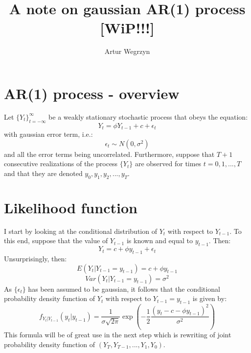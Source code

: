 \documentclass[12pt]{article}
\begin{document}
\title{A note on gaussian AR(1) process [WiP!!!]}
\author{Artur Wegrzyn}
\maketitle


\tableofcontents

\section{AR(1) process - overview}
Let $\{Y_t\}_{t=-\infty}^{\infty}$ be a weakly stationary stochastic process that obeys
the equation:
\begin{equation}
\label{ar1_def_eqtn}
Y_t = \phi Y_{t-1} + c + \epsilon_t
\end{equation}
with gaussian error term, i.e.:
\begin{equation}
\epsilon_t \sim N(0, \sigma^2)
\end{equation}
and all the error terms being uncorrelated. Furthermore, suppose that $T+1$ consecutive 
realizations of the process $\{Y_t\}$ are observed for times $t = 0, 1, ..., T$ and that
 they are denoted $y_0, y_1, y_2, ..., y_T$. \\
 

\section{Likelihood function}
I start by looking at the conditional distribution of $Y_t$ with respect to $Y_{t-1}$. 
To this end, suppose that the value of $Y_{t-1}$ is known and equal to $y_{t-1}$. Then:
\begin{equation*}
Y_t = c + \phi y_{t-1} + \epsilon_t
\end{equation*}
Unsurprisingly, then:
$$ E(Y_t | Y_{t-1} = y_{t-1}) = c + \phi y_{t-1} $$
$$Var(Y_t | Y_{t-1} = y_{t-1}) = \sigma^2 $$
As $\{\epsilon_t\}$ has been assumed to be gaussian, it follows that the conditional 
probability density function of $Y_t$ with respect to $Y_{t-1} = y_{t-1}$ is given by:
\begin{equation}
\label{ar_cond_density}
f_{Y_t | Y_{t-1}}(y_t | y_{t-1}) = \frac{1}{\sigma \sqrt{2 \pi}}
\exp \left( - \frac{1}{2} \frac{(y_t - c - \phi y_{t-1})^2}{\sigma^2} \right)
\end{equation}
This formula will be of great use in the next step which is rewriting of joint 
probability density function of $(Y_T, Y_{T-1}, ..., Y_1, Y_0)$. 
\end{document}
